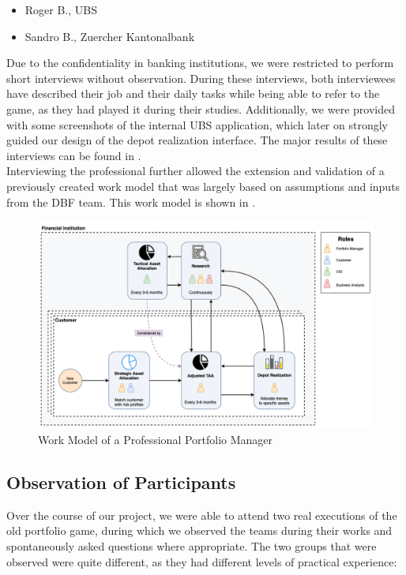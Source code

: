 \begin{itemize}
  \item Roger B., UBS
  \item Sandro B., Zuercher Kantonalbank
\end{itemize}

Due to the confidentiality in banking institutions, we were restricted to perform short interviews without observation. During these interviews, both interviewees have described their job and their daily tasks while being able to refer to the game, as they had played it during their studies. Additionally, we were provided with some screenshots of the internal UBS application, which later on strongly guided our design of the depot realization interface. The major results of these interviews can be found in .\\

Interviewing the professional further allowed the extension and validation of a previously created work model that was largely based on assumptions and inputs from the DBF team. This work model is shown in .

\begin{figure}[h!]
  \centering
  \includegraphics[scale=0.35]{img/work_model_process.png}
  \caption{Work Model of a Professional Portfolio Manager}
  \label{fig:work_model_professional}
\end{figure}


\subsection{Observation of Participants}
Over the course of our project, we were able to attend two real executions of the old portfolio game, during which we observed the teams during their works and spontaneously asked questions where appropriate. The two groups that were observed were quite different, as they had different levels of practical experience:


